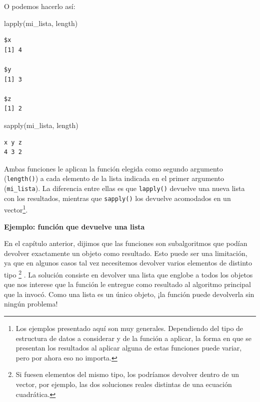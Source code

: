 \documentclass[
]{book}
\newenvironment{Shaded}{\begin{snugshade}}{\end{snugshade}}
\newcommand{\FunctionTok}[1]{\textcolor[rgb]{0.00,0.00,0.00}{#1}}
\newcommand{\NormalTok}[1]{#1}
\begin{document}
O podemos hacerlo así:

\begin{Shaded}
\begin{Highlighting}[]
\FunctionTok{lapply}\NormalTok{(mi\_lista, length)}
\end{Highlighting}
\end{Shaded}

\begin{verbatim}
$x
[1] 4

$y
[1] 3

$z
[1] 2
\end{verbatim}

\begin{Shaded}
\begin{Highlighting}[]
\FunctionTok{sapply}\NormalTok{(mi\_lista, length)}
\end{Highlighting}
\end{Shaded}

\begin{verbatim}
x y z 
4 3 2 
\end{verbatim}

Ambas funciones le aplican la función elegida como segundo argumento (\texttt{length()}) a cada elemento de la lista indicada en el primer argumento (\texttt{mi\_lista}). La diferencia entre ellas es que \texttt{lapply()} devuelve una nueva lista con los resultados, mientras que \texttt{sapply()} los devuelve acomodados en un vector\footnote{Los ejemplos presentado aquí son muy generales. Dependiendo del tipo de estructura de datos a considerar y de la función a aplicar, la forma en que se presentan los resultados al aplicar alguna de estas funciones puede variar, pero por ahora eso no importa.}.

\textbf{Ejemplo: función que devuelve una lista}

En el capítulo anterior, dijimos que las funciones son subalgoritmos que podían devolver exactamente un objeto como resultado. Esto puede ser una limitación, ya que en algunos casos tal vez necesitemos devolver varios elementos de distinto tipo
\footnote{Si fuesen elementos del mismo tipo, los podríamos devolver dentro de un vector, por ejemplo, las dos soluciones reales distintas de una ecuación cuadrática.}
.
La solución consiste en devolver una lista que englobe a todos los objetos que nos interese que la función le entregue como resultado al algoritmo principal que la invocó. Como una lista es un único objeto, ¡la función puede devolverla sin ningún problema!
\end{document}
